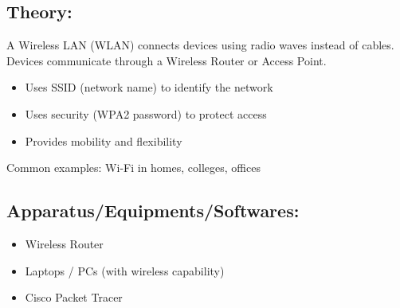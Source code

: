 \documentclass[a4paper,10pt]{article}
\begin{document}
\subsection{Theory:}
A Wireless LAN (WLAN) connects devices using radio waves instead of cables. Devices communicate through a Wireless Router or Access Point.
\begin{itemize}
    \item Uses SSID (network name) to identify the network
    \item Uses security (WPA2 password) to protect access
    \item Provides mobility and flexibility
\end{itemize}
Common examples: Wi-Fi in homes, colleges, offices

\subsection{Apparatus/Equipments/Softwares:}
\begin{itemize}
    \item Wireless Router
    \item Laptops / PCs (with wireless capability)
    \item Cisco Packet Tracer
\end{itemize}
\end{document}
